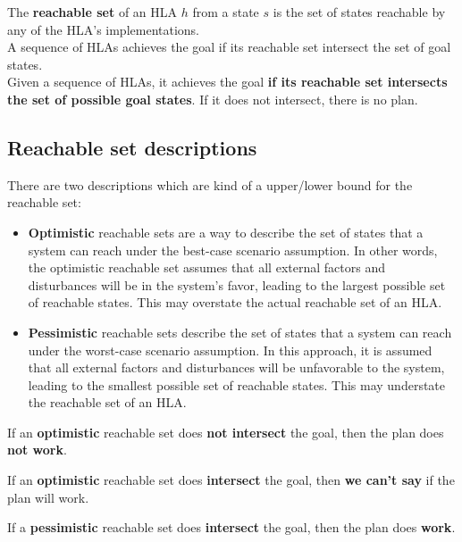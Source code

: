 \documentclass{article}
\begin{document}
The \textbf{reachable set} of an HLA $h$ from a state $s$ is the set of states reachable by any of the HLA's implementations. \\

A sequence of HLAs achieves the goal if its reachable set intersect the set of goal states. \\

Given a sequence of HLAs, it achieves the goal \textbf{if its reachable set intersects the set of possible goal states}. If it does not intersect, there is no plan.

\subsection{Reachable set descriptions}

There are two descriptions which are kind of a upper/lower bound for the reachable set:

\begin{itemize}
    \item \textbf{Optimistic} reachable sets are a way to describe the set of states that a system can reach under the best-case scenario assumption.
    In other words, the optimistic reachable set assumes that all external factors and disturbances will be in the system's favor, leading to the largest possible set of reachable states. This may overstate the actual reachable set of an HLA.
    \item \textbf{Pessimistic} reachable sets describe the set of states that a system can reach under the  worst-case scenario assumption.
    In this approach, it is assumed that all external factors and disturbances will be unfavorable to the system, leading to the smallest possible set of reachable states. This may understate the reachable set of an HLA.
\end{itemize}

\begin{flushleft}
If an \textbf{optimistic} reachable set does \textbf{not intersect} the goal, then the plan does \textbf{not work}. \\
\end{flushleft}

\begin{flushleft}
If an \textbf{optimistic} reachable set does \textbf{intersect} the goal, then \textbf{we can't say} if the plan will work. \\
\end{flushleft}

\begin{flushleft}
If a \textbf{pessimistic} reachable set does \textbf{intersect} the goal, then the plan does \textbf{work}. \\
\end{flushleft}
\end{document}
